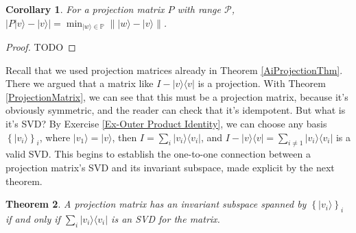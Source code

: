 \documentclass{amsbook}
\newtheorem{theorem}{Theorem}
\newtheorem{corollary}[theorem]{Corollary}
\begin{document}
\begin{corollary}\label{closest}
For a projection matrix $P$ with range $\mathcal P$, $\left|P|v\rangle-|v\rangle\right|=\min_{|w\rangle\in\mathbb P}\left\| |w\rangle-|v\rangle\right\|$.
\end{corollary}

\begin{proof}
  TODO
\end{proof}

Recall that we used projection matrices already in Theorem \ref{AiProjectionThm}.  There we argued that a matrix like $I-|v\rangle\langle v|$ is a projection.  With Theorem \ref{ProjectionMatrix}, we can see that this must be a projection matrix, because it's obviously symmetric, and the reader can check that it's idempotent.  But what is it's SVD?  By Exercise \ref{Ex-Outer Product Identity}, we can choose any basis $\left\{|v_i\rangle\right\}_i$, where $|v_1\rangle=|v\rangle$, then $I=\sum_i|v_i\rangle\langle v_i|$, and $I-|v\rangle\langle v|=\sum_{i\neq1}|v_i\rangle\langle v_i|$ is a valid SVD.  This begins to establish the one-to-one connection between a projection matrix's SVD and its invariant subspace, made explicit by the next theorem.

\begin{theorem}\label{projection_svd}
A projection matrix has an invariant subspace spanned by $\left\{|v_i\rangle\right\}_i$ if and only if $\sum_i|v_i\rangle\langle v_i|$ is an SVD for the matrix.
\end{theorem}
\end{document}

